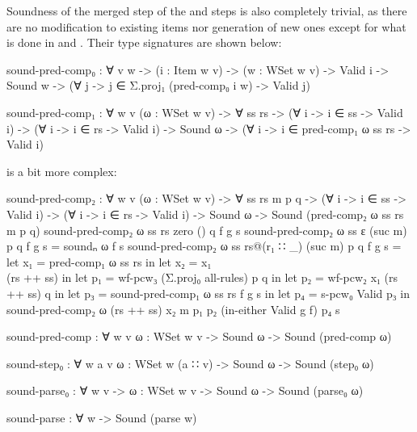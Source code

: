 		Soundness of the merged step  of the 
		and  steps is also completely trivial, as there are no
		modification to existing items nor generation of new ones except for
		what is done in  and . Their type
		signatures are shown below:

		\begin{code}
			sound-pred-comp₀ : ∀ {v w} ->
			  (i : Item w v) ->
			  (w : WSet w v) ->
			  Valid i -> Sound w ->
			  (∀ {j} -> j ∈ Σ.proj₁ (pred-comp₀ i w) -> Valid j)

			sound-pred-comp₁ : ∀ {w v} (ω : WSet w v) -> ∀ ss rs ->
			  (∀ {i} -> i ∈ ss -> Valid i) ->
			  (∀ {i} -> i ∈ rs -> Valid i) ->
			  Sound ω -> (∀ {i} -> i ∈ pred-comp₁ ω ss rs -> Valid i)
		
		\end{code}

		 is a bit more complex:

		\begin{code}

			sound-pred-comp₂ : ∀ {w v} (ω : WSet w v) -> ∀ ss rs m p q ->
			  (∀ {i} -> i ∈ ss -> Valid i) ->
			  (∀ {i} -> i ∈ rs -> Valid i) ->
			  Sound ω -> Sound (pred-comp₂ ω ss rs m p q)
			sound-pred-comp₂ ω ss rs zero () q f g s
			sound-pred-comp₂ ω ss ε (suc m) p q f g s = soundₙ ω f s
			sound-pred-comp₂ ω ss rs@(r₁ ∷ _) (suc m) p q f g s =
			  let x₁ = pred-comp₁ ω ss rs in
			  let x₂ = x₁ \\ (rs ++ ss) in
			  let p₁ = wf-pcw₃ (Σ.proj₀ all-rules) p q  in
			  let p₂ = wf-pcw₂ x₁ (rs ++ ss) q in
			  let p₃ = sound-pred-comp₁ ω ss rs f g s in
			  let p₄ = s-pcw₀ Valid p₃ in
			  sound-pred-comp₂ ω (rs ++ ss) x₂ m p₁ p₂ (in-either Valid g f) p₄ s
		
		\end{code}

		\begin{code}

			sound-pred-comp : ∀ {w v} {ω : WSet w v} -> 
			  Sound ω -> Sound (pred-comp ω)

			sound-step₀ : ∀ {w a v} {ω : WSet w (a ∷ v)} -> 
			  Sound ω -> Sound (step₀ ω)

			sound-parse₀ : ∀ {w v} -> {ω : WSet w v} -> 
			  Sound ω -> Sound (parse₀ ω)

			sound-parse : ∀ w -> Sound (parse w)

		\end{code}

